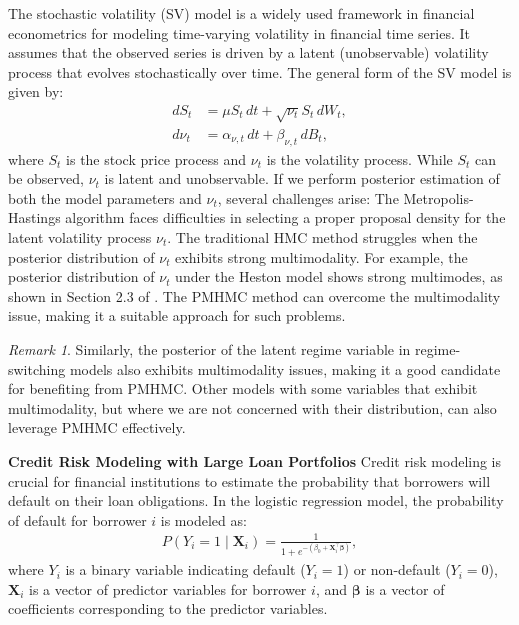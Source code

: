 \documentclass[11pt,a4paper]{article}
\theoremstyle{remark}
\newtheorem{remark}{Remark}
\begin{document}
The stochastic volatility (SV) model is a widely used framework in financial econometrics for modeling time-varying volatility in financial time series. It assumes that the observed series is driven by a latent (unobservable) volatility process that evolves stochastically over time. The general form of the SV model is given by:
\begin{align}
    dS_t &= \mu S_t \, dt + \sqrt{\nu_t} S_t \, dW_t, \\
    d\nu_t &= \alpha_{\nu,t} \, dt + \beta_{\nu,t} \, dB_t,
\end{align}
where $S_t$ is the stock price process and $\nu_t$ is the volatility process. While $S_t$ can be observed, $\nu_t$ is latent and unobservable. If we perform posterior estimation of both the model parameters and $\nu_t$, several challenges arise: The Metropolis-Hastings algorithm faces difficulties in selecting a proper proposal density for the latent volatility process $\nu_t$. The traditional HMC method struggles when the posterior distribution of $\nu_t$ exhibits strong multimodality. For example, the posterior distribution of $\nu_t$ under the Heston model shows strong multimodes, as shown in Section 2.3 of \cite{cape2015estimating}. The PMHMC method can overcome the multimodality issue, making it a suitable approach for such problems.
\begin{remark}
	Similarly, the posterior of the latent regime variable in regime-switching models also exhibits multimodality issues, making it a good candidate for benefiting from PMHMC. Other models with some variables that exhibit multimodality, but where we are not concerned with their distribution, can also leverage PMHMC effectively.
\end{remark}

\smallskip
\noindent \textbf{Credit Risk Modeling with Large Loan Portfolios} 
Credit risk modeling is crucial for financial institutions to estimate the probability that borrowers will default on their loan obligations. In the logistic regression model, the probability of default for borrower $i$ is modeled as:
\begin{align}
	P(Y_i = 1 \mid \mathbf{X}_i) = \frac{1}{1 + e^{-(\beta_0 + \mathbf{X}_i^\top \boldsymbol{\beta})}},
\end{align}
where $Y_i$ is a binary variable indicating default ($Y_i = 1$) or non-default ($Y_i = 0$), $\mathbf{X}_i$ is a vector of predictor variables for borrower $i$, and $\boldsymbol{\beta}$ is a vector of coefficients corresponding to the predictor variables.
\end{document}
